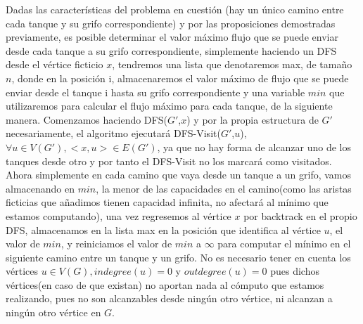 \documentclass{article}
\begin{document}
    Dadas las caracter\'isticas del problema en cuesti\'on (hay un \'unico camino entre cada tanque y su grifo correspondiente) y por las proposiciones demostradas previamente, 
    es posible determinar el valor m\'aximo flujo que se puede enviar desde cada tanque a su grifo correspondiente, 
    simplemente haciendo un DFS desde el v\'ertice ficticio $x$, tendremos una lista que denotaremos max, de tama\~no $n$, donde en la posici\'on i, almacenaremos el valor 
    m\'aximo de flujo que se puede enviar desde el tanque i hasta su grifo correspondiente y una variable $min$ que utilizaremos para calcular el flujo m\'aximo para cada 
    tanque, de la siguiente manera. Comenzamos haciendo DFS($G'$,$x$) y por la propia estructura de $G'$ necesariamente, el algoritmo ejecutar\'a DFS-Visit($G'$,$u$), 
    $\forall u \in V(G'), <x,u> \in E(G')$, ya que no hay forma de alcanzar uno de los tanques desde otro y por tanto el DFS-Visit no los marcar\'a como visitados. Ahora simplemente
    en cada camino que vaya desde un tanque a un grifo, vamos almacenando en $min$, la menor de las capacidades en el camino(como las aristas ficticias que a\~nadimos tienen 
    capacidad infinita, no afectar\'a al m\'inimo que estamos computando), una vez regresemos al v\'ertice $x$ por backtrack en el propio DFS, almacenamos en la lista max en la posici\'on 
    que identifica al v\'ertice $u$, el valor de $min$, y reiniciamos el valor de $min$ a $\infty$ para computar el m\'inimo en el siguiente camino entre un tanque y un grifo. No es necesario
    tener en cuenta los v\'ertices $u \in V(G), indegree(u) = 0$ y $outdegree(u) = 0$ pues dichos v\'ertices(en caso de que existan) no aportan nada al c\'omputo que estamos realizando, pues no son 
    alcanzables desde ning\'un otro v\'ertice, ni alcanzan a ning\'un otro v\'ertice en $G$.\\\\ 
\end{document}
